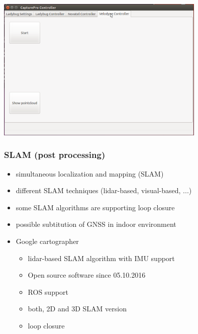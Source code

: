 \documentclass[aspectratio=169]{beamer}
\begin{document}
  \begin{frame}
   \begin{center}
    \includegraphics[width=10cm]{./Abbildungen/GUI_4.png}
   \end{center}
  \end{frame}
  
  \begin{frame}
   \frametitle{SLAM (post processing)}
   \begin{itemize}
    \item simultaneous localization and mapping (SLAM)
    \item different SLAM techniques (lidar-based, visual-based, ...)
    \item some SLAM algorithms are supporting loop closure
    \item possible subtitution of GNSS in indoor environment
    \pause
    \item Google cartographer
    \begin{itemize}
     \item lidar-based SLAM algorithm with IMU support
     \item Open source software since 05.10.2016
     \item ROS support
     \item both, 2D and 3D SLAM version \citep{Hess2016}
     \item loop closure
    \end{itemize}
   \end{itemize}
  \end{frame}
  
  \begin{frame}
  \end{frame}
\end{document}
